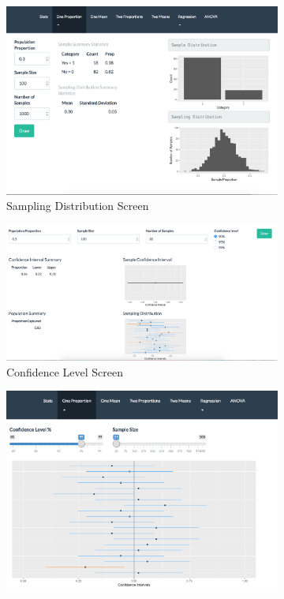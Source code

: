 \documentclass[11pt]{book}
\begin{document}
\begin{figure}
        \centering
        \quad
        \begin{subfigure}[b]{0.5\textwidth}
                \includegraphics[width=\textwidth]{OneProp.png}
                \caption{Sampling Distribution Screen }
                \label{fig:OneProp}
        \end{subfigure}%
	\quad
        \begin{subfigure}[b]{0.5\textwidth}
                \includegraphics[width=\textwidth]{OnePropCL.png}
                \caption{Confidence Level Screen} 
                \label{fig:OnePropCL}
        \end{subfigure}
	\quad
        \begin{subfigure}[b]{0.5\textwidth}
                \includegraphics[width=\textwidth]{OnePropCI.png}

\end{subfigure}
\end{figure}
\end{document}
